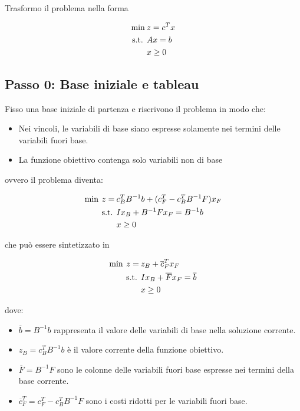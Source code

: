 Trasformo il problema nella forma

\begin{align*}
\min \:& z=c^Tx \\
\text{s.t. }& Ax=b \\
&x\geq 0
\end{align*}

\subsection{Passo 0: Base iniziale e tableau}

Fisso una base iniziale di partenza e riscrivono il problema in modo che:

\begin{itemize}
\item Nei vincoli, le variabili di base siano espresse solamente nei termini delle variabili fuori base.
\item La funzione obiettivo contenga solo variabili non di base
\end{itemize}

\noindent ovvero il problema diventa:

\begin{align*}
\min \: z=\: &c_{B}^T B^{-1}b + (c_{F}^T - c_{B}^T B^{-1}F)x_F \\
\text{s.t. }& Ix_B + B^{-1}Fx_F = B^{-1}b \\
&x\geq 0
\end{align*}

\noindent che può essere sintetizzato in 

\begin{align*}
\min \: z=\: &z_B + \overline{c}_{F}^Tx_F \\
\text{s.t. }& Ix_B + \overline{F}x_F = \overline{b} \\
&x\geq 0
\end{align*}

\noindent dove:

\begin{itemize}
\item $ \overline{b} =  B^{-1}b $ rappresenta il valore delle variabili di base nella soluzione corrente.
\item $ z_B =  c_{B}^T B^{-1}b$ è il valore corrente della funzione obiettivo.
\item $ \overline{F} = B^{-1}F $ sono le colonne delle variabili fuori base espresse nei termini della base corrente.
\item $ \overline{c}_{F}^T = c_{F}^T - c_{B}^T B^{-1}F$ sono i costi ridotti per le variabili fuori base.
\end{itemize}

